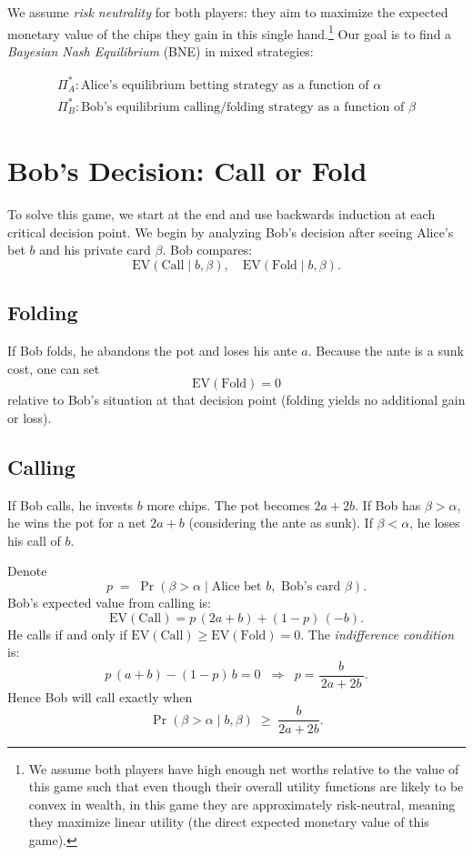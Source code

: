 \documentclass{article}
\begin{document}
We assume \emph{risk neutrality} for both players: they aim to maximize the expected monetary value of the chips they gain in this single hand.\footnote{We assume both players have high enough net worths relative to the value of this game such that even though their overall utility functions are likely to be convex in wealth, in this game they are approximately risk-neutral, meaning they maximize linear utility (the direct expected monetary value of this game).} Our goal is to find a \emph{Bayesian Nash Equilibrium} (BNE) in mixed strategies:

\begin{align*}
\Pi_{A}^* : \text{Alice's equilibrium betting strategy as a function of }\alpha \\
\Pi_{B}^* : \text{Bob's equilibrium calling/folding strategy as a function of }\beta
\end{align*}

\section{Bob's Decision: Call or Fold}

To solve this game, we start at the end and use backwards induction at each critical decision point. We begin by analyzing Bob's decision after seeing Alice's bet $b$ and his private card $\beta$. Bob compares:
\[
\text{EV}(\text{Call}\mid b, \beta), \quad \text{EV}(\text{Fold}\mid b, \beta).
\]

\subsection{Folding}

If Bob folds, he abandons the pot and loses his ante $a$.  Because the ante is a sunk cost, one can set
\[
\text{EV}(\text{Fold}) = 0
\]
relative to Bob's situation at that decision point (folding yields no additional gain or loss).

\subsection{Calling}

If Bob calls, he invests $b$ more chips.  The pot becomes $2a + 2b$.  If Bob has $\beta > \alpha$, he wins the pot for a net $2a + b$ (considering the ante as sunk).  If $\beta < \alpha$, he loses his call of $b$.

Denote
\[
p \;=\; \Pr(\beta > \alpha \mid \text{Alice bet } b, \text{ Bob's card } \beta ).
\]
Bob's expected value from calling is:
\[
\text{EV}(\text{Call}) = p\,(2a + b) + (1-p)\,(-b).
\]
He calls if and only if $\text{EV}(\text{Call}) \ge \text{EV}(\text{Fold}) = 0$.  The \emph{indifference condition} is:
\[
p\,(a + b) - (1-p)\,b = 0 
\;\;\Longrightarrow\;\;
p = \frac{b}{\,2a + 2b\,}.
\]
Hence Bob will call exactly when 
\[
\Pr(\beta > \alpha \mid b, \beta) \;\ge\; \frac{b}{2a + 2b}.
\]
\end{document}
